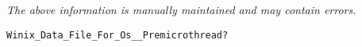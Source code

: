 \label{pkg:winix\_data\_file\_for\_posix\_\_premicrothread}

{\tiny \it The above information is manually maintained and may contain errors.}
\begin{verbatim}
Winix_Data_File_For_Os__Premicrothread?
\end{verbatim}
